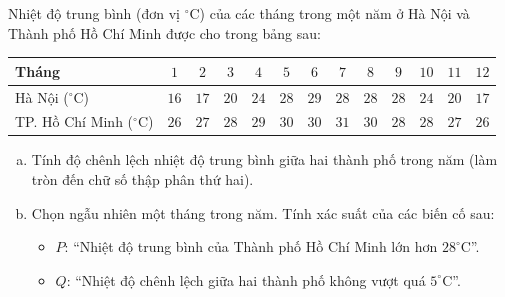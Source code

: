 \begin{bt}%
Nhiệt độ trung bình (đơn vị $^\circ\text{C}$) của các tháng trong một năm ở Hà Nội và Thành phố Hồ Chí Minh được cho trong bảng sau:
\begin{center}
\begin{tabular}{|l|c|c|c|c|c|c|c|c|c|c|c|c|}
\hline
\textbf{Tháng} & $1$ & $2$ & $3$ & $4$ & $5$ & $6$ & $7$ & $8$ & $9$ & $10$ & $11$ & $12$ \\ \hline
Hà Nội ($^\circ\text{C}$) & $16$ & $17$ & $20$ & $24$ & $28$ & $29$ & $28$ & $28$ & $28$ & $24$ & $20$ & $17$ \\ \hline
TP. Hồ Chí Minh ($^\circ\text{C}$) & $26$ & $27$ & $28$ & $29$ & $30$ & $30$ & $31$ & $30$ & $28$ & $28$ & $27$ & $26$ \\ \hline
\end{tabular}
\end{center}
\begin{enumerate}[a)]
    \item Tính độ chênh lệch nhiệt độ trung bình giữa hai thành phố trong năm (làm tròn đến chữ số thập phân thứ hai).
    \item Chọn ngẫu nhiên một tháng trong năm. Tính xác suất của các biến cố sau:
    \begin{itemize}
        \item $P$: ``Nhiệt độ trung bình của Thành phố Hồ Chí Minh lớn hơn $28^\circ\text{C}$''.
        \item $Q$: ``Nhiệt độ chênh lệch giữa hai thành phố không vượt quá $5^\circ\text{C}$''.
    \end{itemize}
\end{enumerate}
\end{bt}
